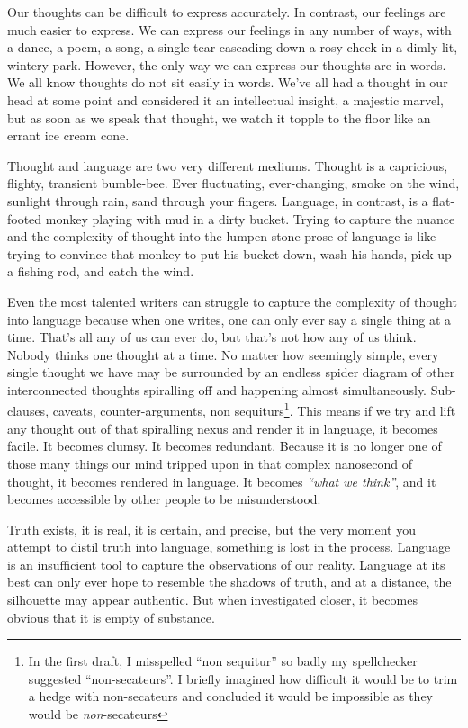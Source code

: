 \newpage
Our thoughts can be difficult to express accurately. In contrast, our feelings are much easier to express. We can express our feelings in any number of ways, with a dance, a poem, a song, a single tear cascading down a rosy cheek in a dimly lit, wintery park. However, the only way we can express our thoughts are in words. We all know thoughts do not sit easily in words. We've all had a thought in our head at some point and considered it an intellectual insight, a majestic marvel, but as soon as we speak that thought, we watch it topple to the floor like an errant ice cream cone.

Thought and language are two very different mediums. Thought is a capricious, flighty, transient bumble-bee. Ever fluctuating, ever-changing, smoke on the wind, sunlight through rain, sand through your fingers. Language, in contrast, is a flat-footed monkey playing with mud in a dirty bucket. Trying to capture the nuance and the complexity of thought into the lumpen stone prose of language is like trying to convince that monkey to put his bucket down, wash his hands, pick up a fishing rod, and catch the wind.

Even the most talented writers can struggle to capture the complexity of thought into language because when one writes, one can only ever say a single thing at a time. That's all any of us can ever do, but that's not how any of us think. Nobody thinks one thought at a time. No matter how seemingly simple, every single thought we have may be surrounded by an endless spider diagram of other interconnected thoughts spiralling off and happening almost simultaneously. Sub-clauses, caveats, counter-arguments, non sequiturs\footnote{In the first draft, I misspelled ``non sequitur'' so badly my spellchecker suggested ``non-secateurs''. I briefly imagined how difficult it would be to trim a hedge with non-secateurs and concluded it would be impossible as they would be \textit{non}-secateurs}. This means if we try and lift any thought out of that spiralling nexus and render it in language, it becomes facile. It becomes clumsy. It becomes redundant. Because it is no longer one of those many things our mind tripped upon in that complex nanosecond of thought, it becomes rendered in language. It becomes \textit{``what we think''}, and it becomes accessible by other people to be misunderstood.

Truth exists, it is real, it is certain, and precise, but the very moment you attempt to distil truth into language, something is lost in the process. Language is an insufficient tool to capture the observations of our reality. Language at its best can only ever hope to resemble the shadows of truth, and at a distance, the silhouette may appear authentic. But when investigated closer, it becomes obvious that it is empty of substance.

